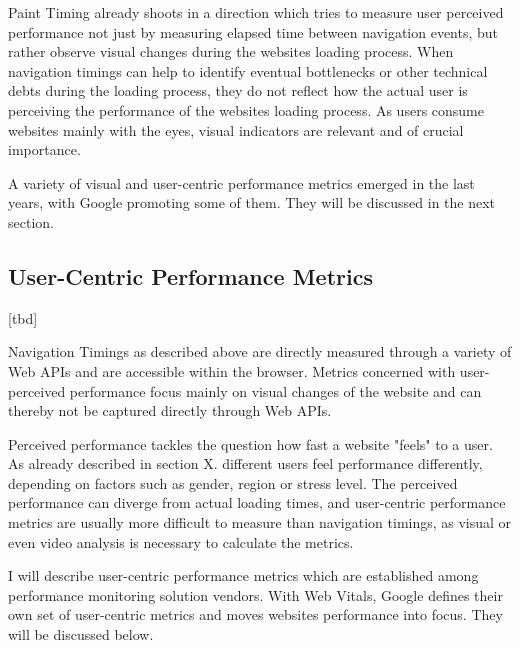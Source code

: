
Paint Timing already shoots in a direction which tries to measure user perceived performance not just by measuring elapsed time between navigation events, but rather observe visual changes during the websites loading process.
When navigation timings can help to identify eventual bottlenecks or other technical debts during the loading process, they do not reflect how the actual user is perceiving the performance of the websites loading process.
As users consume websites mainly with the eyes, visual indicators are relevant and of crucial importance.

A variety of visual and user-centric performance metrics emerged in the last years, with Google promoting some of them.
They will be discussed in the next section.






\subsection{User-Centric Performance Metrics}


[tbd]



Navigation Timings as described above are directly measured through a variety of Web APIs and are accessible within the browser.
Metrics concerned with user-perceived performance focus mainly on visual changes of the website and can thereby not be captured directly through Web APIs.

Perceived performance tackles the question how fast a website "feels" to a user.
As already described in section X. different users feel performance differently, depending on factors such as gender, region or stress level.
The perceived performance can diverge from actual loading times, and user-centric performance metrics are usually more difficult to measure than navigation timings, as visual or even video analysis is necessary to calculate the metrics. %

I will describe user-centric performance metrics which are established among performance monitoring solution vendors.
With Web Vitals, Google defines their own set of user-centric metrics and moves websites performance into focus.
They will be discussed below.



